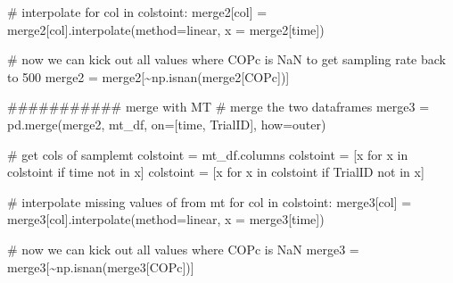 \documentclass[
  letterpaper,
  DIV=11,
  numbers=noendperiod]{scrreprt}
\newenvironment{Shaded}{\begin{snugshade}}{\end{snugshade}}
\newcommand{\CommentTok}[1]{\textcolor[rgb]{0.37,0.37,0.37}{#1}}
\newcommand{\ControlFlowTok}[1]{\textcolor[rgb]{0.00,0.23,0.31}{#1}}
\newcommand{\KeywordTok}[1]{\textcolor[rgb]{0.00,0.23,0.31}{#1}}
\newcommand{\NormalTok}[1]{\textcolor[rgb]{0.00,0.23,0.31}{#1}}
\newcommand{\OperatorTok}[1]{\textcolor[rgb]{0.37,0.37,0.37}{#1}}
\newcommand{\StringTok}[1]{\textcolor[rgb]{0.13,0.47,0.30}{#1}}
\begin{document}
\begin{Shaded}
\begin{Highlighting}[]
    \CommentTok{\# interpolate }
    \ControlFlowTok{for}\NormalTok{ col }\KeywordTok{in}\NormalTok{ colstoint:}
\NormalTok{        merge2[col] }\OperatorTok{=}\NormalTok{ merge2[col].interpolate(method}\OperatorTok{=}\StringTok{\textquotesingle{}linear\textquotesingle{}}\NormalTok{, x }\OperatorTok{=}\NormalTok{ merge2[}\StringTok{\textquotesingle{}time\textquotesingle{}}\NormalTok{])}

    \CommentTok{\# now we can kick out all values where COPc is NaN to get sampling rate back to 500 }
\NormalTok{    merge2 }\OperatorTok{=}\NormalTok{ merge2[}\OperatorTok{\textasciitilde{}}\NormalTok{np.isnan(merge2[}\StringTok{\textquotesingle{}COPc\textquotesingle{}}\NormalTok{])]}

    \CommentTok{\#\#\#\#\#\#\#\#\#\#\# merge with MT}
    \CommentTok{\# merge the two dataframes}
\NormalTok{    merge3 }\OperatorTok{=}\NormalTok{ pd.merge(merge2, mt\_df, on}\OperatorTok{=}\NormalTok{[}\StringTok{\textquotesingle{}time\textquotesingle{}}\NormalTok{, }\StringTok{\textquotesingle{}TrialID\textquotesingle{}}\NormalTok{], how}\OperatorTok{=}\StringTok{\textquotesingle{}outer\textquotesingle{}}\NormalTok{)}

    \CommentTok{\# get cols of samplemt}
\NormalTok{    colstoint }\OperatorTok{=}\NormalTok{ mt\_df.columns}
\NormalTok{    colstoint }\OperatorTok{=}\NormalTok{ [x }\ControlFlowTok{for}\NormalTok{ x }\KeywordTok{in}\NormalTok{ colstoint }\ControlFlowTok{if} \StringTok{\textquotesingle{}time\textquotesingle{}} \KeywordTok{not} \KeywordTok{in}\NormalTok{ x]}
\NormalTok{    colstoint }\OperatorTok{=}\NormalTok{ [x }\ControlFlowTok{for}\NormalTok{ x }\KeywordTok{in}\NormalTok{ colstoint }\ControlFlowTok{if} \StringTok{\textquotesingle{}TrialID\textquotesingle{}} \KeywordTok{not} \KeywordTok{in}\NormalTok{ x]}

    \CommentTok{\# interpolate missing values of from mt}
    \ControlFlowTok{for}\NormalTok{ col }\KeywordTok{in}\NormalTok{ colstoint:}
\NormalTok{        merge3[col] }\OperatorTok{=}\NormalTok{ merge3[col].interpolate(method}\OperatorTok{=}\StringTok{\textquotesingle{}linear\textquotesingle{}}\NormalTok{, x }\OperatorTok{=}\NormalTok{ merge3[}\StringTok{\textquotesingle{}time\textquotesingle{}}\NormalTok{])}

    \CommentTok{\# now we can kick out all values where COPc is NaN}
\NormalTok{    merge3 }\OperatorTok{=}\NormalTok{ merge3[}\OperatorTok{\textasciitilde{}}\NormalTok{np.isnan(merge3[}\StringTok{\textquotesingle{}COPc\textquotesingle{}}\NormalTok{])]}


\end{Highlighting}
\end{Shaded}
\end{document}
